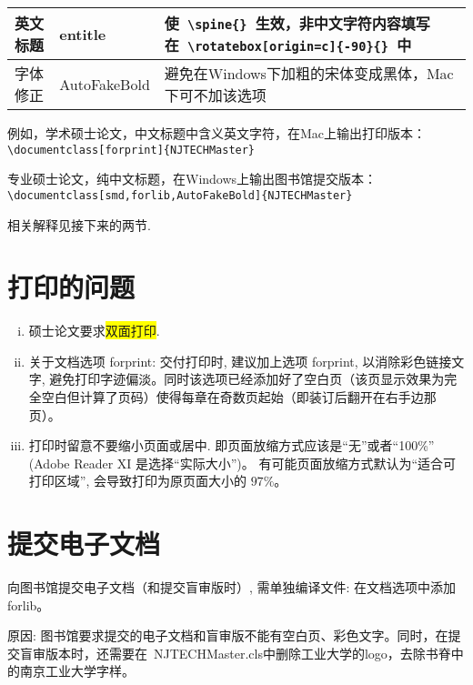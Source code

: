 \documentclass[smd,entitle,forlib,AutoFakeBold]{NJTECHMaster}
\begin{document}
\begin{table}[h]
\begin{tabular}{l|l|l}
		英文标题                                        & entitle      & 使~\verb|\spine{}|~生效，非中文字符内容填写在~\verb|\rotatebox[origin=c]{-90}{}|~中 \\ \hline
		字体修正                                        & AutoFakeBold & 避免在Windows下加粗的宋体变成黑体，Mac下可不加该选项                                                                                                                                                                                                                                                         \\ \hline
	\end{tabular}
\end{table}

例如，学术硕士论文，中文标题中含义英文字符，在Mac上输出打印版本：\\ \verb|\documentclass[forprint]{NJTECHMaster}|

专业硕士论文，纯中文标题，在Windows上输出图书馆提交版本：\\	\verb|\documentclass[smd,forlib,AutoFakeBold]{NJTECHMaster} | 
 
相关解释见接下来的两节.

\section{打印的问题}
\begin{enumerate}[i)]
	\item  硕士论文要求\colorbox{yellow}{双面打印}.
	\item  关于文档选项 forprint: 交付打印时, 建议加上选项 forprint, 以消除彩色链接文字, 避免打印字迹偏淡。同时该选项已经添加好了空白页（该页显示效果为完全空白但计算了页码）使得每章在奇数页起始（即装订后翻开在右手边那页）。
	\item  打印时留意不要缩小页面或居中. 即页面放缩方式应该是``无''或者``100\%'' (Adobe Reader XI 是选择``实际大小'')。
	有可能页面放缩方式默认为``适合可打印区域'', 会导致打印为原页面大小的 $97\%$。
\end{enumerate}

\section{提交电子文档}

向图书馆提交电子文档（和提交盲审版时）, 需单独编译文件: 在文档选项中添加 forlib。

原因: 图书馆要求提交的电子文档和盲审版不能有空白页、彩色文字。同时，在提交盲审版本时，还需要在~NJTECHMaster.cls中删除工业大学的logo，去除书脊中的南京工业大学字样。
\end{document}
